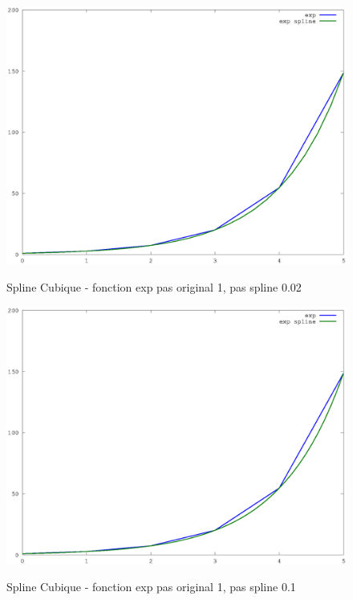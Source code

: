 \documentclass[a4paper,11pt]{article}
\begin{document}
\begin{figure}[h!]
  \begin{centering}
    \includegraphics[scale=0.5]{../exp_5}
    \label{rspro2}
    \par\end{centering}
  \caption{Spline Cubique - fonction exp pas original 1, pas spline 0.02}
  \label{fig:jacobi-conv}
\end{figure}


\begin{figure}[h!]
  \begin{centering}
    \includegraphics[scale=0.5]{../exp_10}
    \label{rspro2}
    \par\end{centering}
  \caption{Spline Cubique - fonction exp pas original 1, pas spline 0.1}
  \label{fig:jacobi-conv}
\end{figure}
\end{document}
